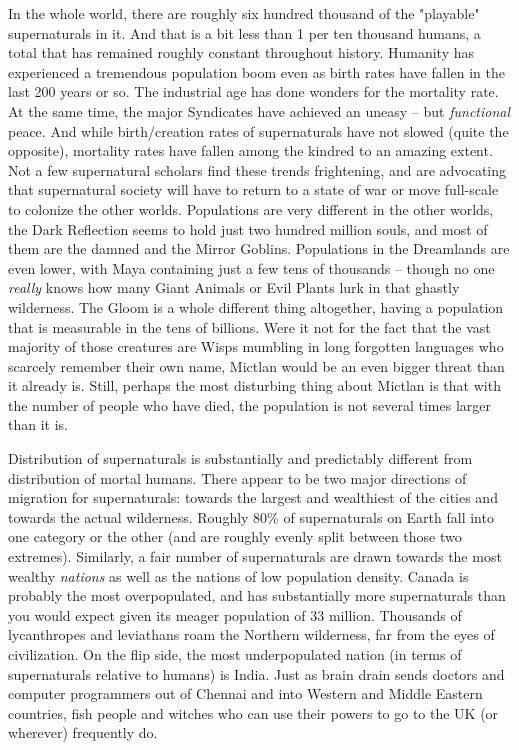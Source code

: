 In the whole world, there are roughly six hundred thousand of the "playable" supernaturals in it. And that is a bit less than 1 per ten thousand humans, a total that has remained roughly constant throughout history. Humanity has experienced a tremendous population boom even as birth rates have fallen in the last 200 years or so. The industrial age has done wonders for the mortality rate. At the same time, the major Syndicates have achieved an uneasy -- but \textit{functional} peace. And while birth/creation rates of supernaturals have not slowed (quite the opposite), mortality rates have fallen among the kindred to an amazing extent. Not a few supernatural scholars find these trends frightening, and are advocating that supernatural society will have to return to a state of war or move full-scale to colonize the other worlds. Populations are very different in the other worlds, the Dark Reflection seems to hold just two hundred million souls, and most of them are the damned and the Mirror Goblins. Populations in the Dreamlands are even lower, with Maya containing just a few tens of thousands -- though no one \textit{really} knows how many Giant Animals or Evil Plants lurk in that ghastly wilderness. The Gloom is a whole different thing altogether, having a population that is measurable in the tens of billions. Were it not for the fact that the vast majority of those creatures are Wisps mumbling in long forgotten languages who scarcely remember their own name, Mictlan would be an even bigger threat than it already is. Still, perhaps the most disturbing thing about Mictlan is that with the number of people who have died, the population is not several times larger than it is.

Distribution of supernaturals is substantially and predictably different from distribution of mortal humans. There appear to be two major directions of migration for supernaturals: towards the largest and wealthiest of the cities and towards the actual wilderness. Roughly 80\% of supernaturals on Earth fall into one category or the other (and are roughly evenly split between those two extremes). Similarly, a fair number of supernaturals are drawn towards the most wealthy \textit{nations} as well as the nations of low population density. Canada is probably the most overpopulated, and has substantially more supernaturals than you would expect given its meager population of 33 million. Thousands of lycanthropes and leviathans roam the Northern wilderness, far from the eyes of civilization. On the flip side, the most underpopulated nation (in terms of supernaturals relative to humans) is India. Just as brain drain sends doctors and computer programmers out of Chennai and into Western and Middle Eastern countries, fish people and witches who can use their powers to go to the UK (or wherever) frequently do.

